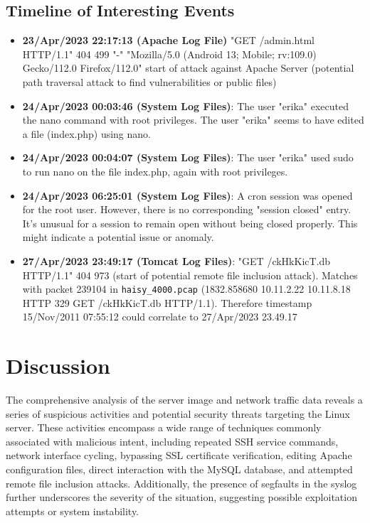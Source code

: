 \subsection{Timeline of Interesting Events}
\begin{itemize}
	\item \textbf{23/Apr/2023 22:17:13 (Apache Log File)} "GET /admin.html HTTP/1.1" 404 499 "-" "Mozilla/5.0 (Android 13; Mobile; rv:109.0) Gecko/112.0 Firefox/112.0" start of attack against Apache Server (potential path traversal attack to find vulnerabilities or public files)
	\item \textbf{24/Apr/2023 00:03:46 (System Log Files)}: The user "erika" executed the nano command with root privileges. The user "erika" seems to have edited a file (index.php) using nano.
	\item \textbf{24/Apr/2023 00:04:07 (System Log Files)}: The user "erika" used sudo to run nano on the file index.php, again with root privileges.
	\item \textbf{24/Apr/2023 06:25:01 (System Log Files)}: A cron session was opened for the root user. However, there is no corresponding "session closed" entry. It's unusual for a session to remain open without being closed properly. This might indicate a potential issue or anomaly.
	\item \textbf{27/Apr/2023 23:49:17 (Tomcat Log Files)}: "GET /ckHkKicT.db HTTP/1.1" 404 973 (start of potential remote file inclusion attack). Matches with packet 239104 in \texttt{haisy\_4000.pcap} (1832.858680	10.11.2.22	10.11.8.18	HTTP	329	GET /ckHkKicT.db HTTP/1.1). Therefore timestamp 15/Nov/2011 07:55:12 could correlate to 27/Apr/2023 23.49.17
\end{itemize}

\section{Discussion}
The comprehensive analysis of the server image and network traffic data reveals a series of suspicious activities and potential security threats targeting the Linux server. These activities encompass a wide range of techniques commonly associated with malicious intent, including repeated SSH service commands, network interface cycling, bypassing SSL certificate verification, editing Apache configuration files, direct interaction with the MySQL database, and attempted remote file inclusion attacks. Additionally, the presence of segfaults in the syslog further underscores the severity of the situation, suggesting possible exploitation attempts or system instability.
\newline

